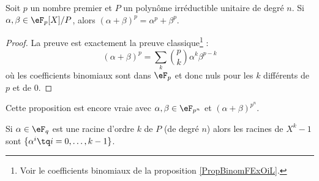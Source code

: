 \begin{lemma}       \label{LemZrUUOz}
	Soit \( p\) un nombre premier et \( P\) un polynôme irréductible unitaire de degré \( n\). Si \( \alpha,\beta\in \eF_p[X]/P\), alors \( (\alpha+\beta)^p=\alpha^p+\beta^p\).
\end{lemma}

\begin{proof}
	La preuve est exactement la preuve classique\footnote{Voir le coefficients binomiaux de la proposition \ref{PropBinomFExOiL}.} :
	\begin{equation}
		(\alpha+\beta)^p=\sum_k{p\choose k} \alpha^k\beta^{p-k}
	\end{equation}
	où les coefficients binomiaux sont dans \( \eF_p\) et donc nuls pour les \( k\) différents de \( p\) et de \( 0\).
\end{proof}
Cette proposition est encore vraie avec \( \alpha,\beta\in\eF_{p^n}\) et \( (\alpha+\beta)^{p^n}\).

\begin{lemma}
	Si \( \alpha\in \eF_q\) est une racine d'ordre \( k\) de \( P\) (de degré \( n\)) alors les racines de \( X^k-1\) sont \( \{ \alpha^i\tq i=0,\ldots, k-1 \}\).
\end{lemma}

